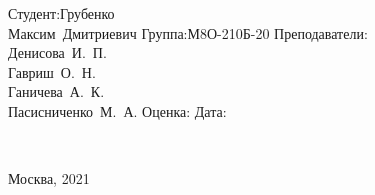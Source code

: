 \vspace{1em}
{
	\hfill\parbox{11cm}{
		\hspace*{10cm}\hspace*{-5cm}Студент:\hfill\hbox {Грубенко \hfill}\\
		\hspace*{10cm}\hspace*{-5cm}\hfill\hbox {Максим Дмитриевич\hfill}\vspace{2mm}
		\hspace*{10cm}\hspace*{-5cm}Группа:\hfill\hbox {М8О-210Б-20}\vspace{2mm}
		\hspace*{10cm}\hspace*{-5cm}Преподаватели:\\
		\hspace*{10cm}\hspace*{-5cm}\hfill\hbox {Денисова И. П.}\\
		\hspace*{10cm}\hspace*{-5cm}\hfill\hbox {Гавриш О. Н.}\\
		\hspace*{10cm}\hspace*{-5cm}\hfill\hbox {Ганичева А. К.}\\
		\hspace*{10cm}\hspace*{-5cm}\hfill\hbox {Пасисниченко М. А.}\vspace{2mm}
		\hspace*{10cm}\hspace*{-5cm}Оценка:\hfill\hbox {}\vspace{2mm}
		\hspace*{10cm}\hspace*{-5cm}Дата:\hfill\hbox {}\\
	}
\\}
\vspace{\fill}
\centerline{Москва, 2021}